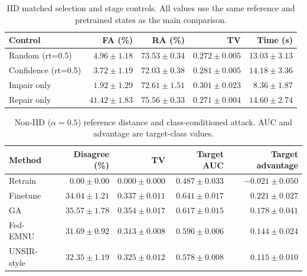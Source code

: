 \begin{table}[H]\centering\small
\caption{IID matched selection and stage controls. All values use the same reference and pretrained states as the main comparison.}
\label{tab:iid-controls}
\begin{tabular}{lrrrr}\toprule Control & FA (\%) & RA (\%) & TV & Time (s)\\\midrule
Random (rt=0.5) & $4.96 \pm 1.18$ & $73.53 \pm 0.34$ & $0.272 \pm 0.005$ & $13.03 \pm 3.13$\\
Confidence (rt=0.5) & $3.72 \pm 1.19$ & $72.03 \pm 0.38$ & $0.281 \pm 0.005$ & $14.18 \pm 3.36$\\
Impair only & $1.92 \pm 1.29$ & $72.61 \pm 1.51$ & $0.301 \pm 0.023$ & $8.36 \pm 1.87$\\
Repair only & $41.42 \pm 1.83$ & $75.56 \pm 0.33$ & $0.271 \pm 0.004$ & $14.60 \pm 2.74$\\
\bottomrule\end{tabular}\end{table}

\begin{table}[H]\centering\small
\caption{Non-IID ($\alpha=0.5$) reference distance and class-conditioned attack. AUC and advantage are target-class values.}
\label{tab:noniid-distance}
\begin{tabular}{lrrrr}\toprule Method & Disagree (\%) & TV & Target AUC & Target advantage\\\midrule
Retrain & $0.00 \pm 0.00$ & $0.000 \pm 0.000$ & $0.487 \pm 0.033$ & $-0.021 \pm 0.050$\\
Finetune & $34.04 \pm 1.21$ & $0.337 \pm 0.011$ & $0.641 \pm 0.017$ & $0.221 \pm 0.027$\\
GA & $35.57 \pm 1.78$ & $0.354 \pm 0.017$ & $0.617 \pm 0.015$ & $0.178 \pm 0.041$\\
Fed-EMNU & $31.69 \pm 0.92$ & $0.313 \pm 0.008$ & $0.596 \pm 0.006$ & $0.144 \pm 0.024$\\
UNSIR-style & $32.35 \pm 1.19$ & $0.325 \pm 0.012$ & $0.578 \pm 0.008$ & $0.115 \pm 0.010$\\
\bottomrule\end{tabular}\end{table}

